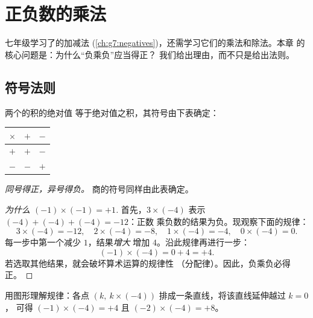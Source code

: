 \chapter{正负数的乘法}\label{ch:g8:negprod}

七年级学习了的加减法
(\cref{ch:g7:negatives})，还需学习它们的乘法和除法。本章
的核心问题是：为什么“负乘负”应当得正？
我们给出理由，而不只是给出法则。

\section{符号法则}

\begin{theorem}[积的符号]\label{thm:g8:negprod:rules}
两个的积的绝对值
等于绝对值之积，其符号由下表确定：
\begin{center}
\renewcommand{\arraystretch}{1.3}
\begin{tabular}{c|cc}
$\times$ & $+$ & $-$ \\
\hline
$+$ & $+$ & $-$ \\
$-$ & $-$ & $+$ \\
\end{tabular}
\end{center}
\emph{同号得正，异号得负。}
商的符号同样由此表确定。
\end{theorem}

\begin{proof}[为什么 $(-1) \times (-1) = +1$]
首先，$3 \times (-4)$ 表示 $(-4) + (-4) + (-4) = -12$：正数
乘负数的结果为负。现观察下面的规律：
\[
3 \times (-4) = -12, \quad
2 \times (-4) = -8, \quad
1 \times (-4) = -4, \quad
0 \times (-4) = 0 .
\]
每一步中第一个减少 $1$，结果\emph{增大}
增加 $4$。沿此规律再进行一步：
\[
(-1) \times (-4) = 0 + 4 = +4 .
\]
若选取其他结果，就会破坏算术运算的规律性
（分配律）。因此，负乘负必得正。
\end{proof}

\begin{omfigure}

{\small 用图形理解规律：各点
$(k,\ k \times (-4))$ 排成一条直线，将该直线延伸越过 $k = 0$，
可得 $(-1)\times(-4) = +4$ 且 $(-2)\times(-4) = +8$。}
\end{omfigure}

